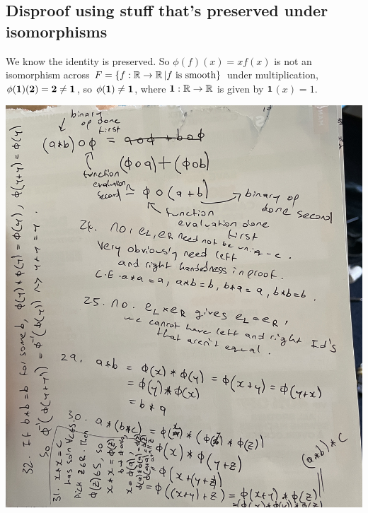 \subsection*{Disproof using stuff that's preserved under isomorphisms}
We know the identity is preserved. So $\phi(f)(x) = xf(x)$ is not an isomorphism across $F = \{f: \operatorname{\mathbb{R}} \to \operatorname{\mathbb{R}}| f \text{ is smooth}\}$ under multiplication, $\phi(\bf{1})(2) = 2 \neq 1$, so $\phi(\bf{1}) \neq \bf{1}$, where $\bf{1}: \operatorname{\mathbb{R}} \to \operatorname{\mathbb{R}}$ is given by $\bf{1}$$ (x) = 1$.
\begin{center}
\includegraphics[scale=0.1, angle=-90]{fig/IMG_7271.jpeg}
\end{center}
\begin{center}

\end{center}$$
